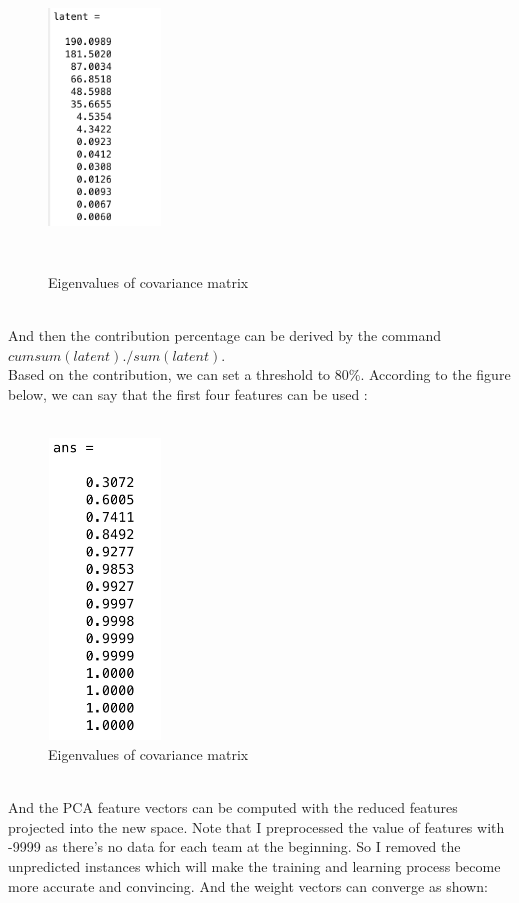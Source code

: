 \documentclass{article}
\begin{document}
 \begin{figure}[htbp]
 \centering
 \includegraphics[width=3cm, height=8cm]{latent}
  \caption{Eigenvalues of covariance matrix}
\end{figure}
\\
And then the contribution percentage can be derived by the command $cumsum(latent)./sum(latent)$.
\\ 
Based on the contribution, we can set a threshold to 80\%. According to the figure below, we can say that the first four features can be used :
\\
\\
 \begin{figure}[htbp]
 \centering
 \includegraphics[width=3cm, height=8cm]{contribution}
  \caption{Eigenvalues of covariance matrix}
\end{figure}
\\
And the PCA feature vectors can be computed with the reduced features projected into the new space. Note that I preprocessed the value of features with -9999 as there's no data for each team at the beginning. So I removed the unpredicted instances which will make the training and learning process become more accurate and convincing. And the weight vectors can converge as shown:
\end{document}
